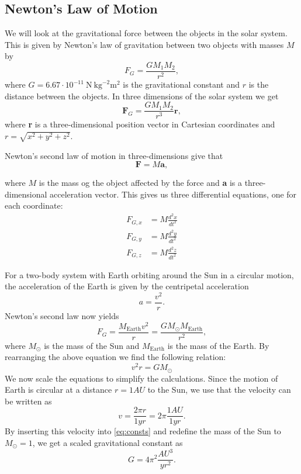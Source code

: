 \documentclass[12pt,a4paper,english]{article}
\begin{document}
\subsection{Newton's Law of Motion}
\label{subsect:Newton}
We will look at the gravitational force between the objects in the solar system. This is given by Newton's law of gravitation between two objects with masses $M$ by
\begin{equation}
\label{eq:2D_FG}
F_G=\frac{GM_1M_2}{r^2},
\end{equation}
where $G=6.67\cdot10^{-11} \ \textrm{N} \ \textrm{kg}^{-2} \textrm{m}^2$ is the gravitational constant and $r$ is the distance between the objects. In three dimensions of the solar system we get
\begin{equation}
\label{eq:3D_FG}
\textbf{F}_G=\frac{GM_1M_2}{r^3}\textbf{r},
\end{equation}
where \textbf{r} is a three-dimensional position vector in Cartesian coordinates and $r=\sqrt{x^2+y^2+z^2}$.

Newton's second law of motion in three-dimensions give that 
\begin{equation}
\label{eq:N2L}
\textbf{F}=M\textbf{a},
\end{equation}

where $M$ is the mass og the object affected by the force and \textbf{a} is a three-dimensional acceleration vector. This gives us three differential equations, one for each coordinate:
\begin{align*}
F_{G,x}&=M\frac{d^2x}{dt^2}\\
F_{G,y}&=M\frac{d^2y}{dt^2}\\
F_{G,z}&=M\frac{d^2z}{dt^2}
\end{align*}

For a two-body system with Earth orbiting around the Sun in a circular motion, the acceleration of the Earth is given by the centripetal acceleration \[a=\frac{v^2}{r}.\]
Newton's second law now yields
\begin{equation}
F_G=\frac{M_{\text{Earth}}v^2}{r}=\frac{GM_{\odot}M_{\text{Earth}}}{r^2},
\end{equation}
where $M_{\odot}$ is the mass of the Sun and $M_{\text{Earth}}$ is the mass of the Earth. By rearranging the above equation we find the following relation:
\begin{equation}
\label{eq:consts}
v^2r=GM_{\odot}
\end{equation}
We now scale the equations to simplify the calculations.
Since the motion of Earth is circular at a distance $r=1AU$ to the Sun, we use that the velocity can be written as
\begin{equation}
\label{eq:circ_vel}
v=\frac{2\pi r}{1yr}=2\pi\frac{1AU}{1yr}.
\end{equation}
By inserting this velocity into \ref{eq:consts} and redefine the mass of the Sun to $M_{\odot}=1$, we get a scaled gravitational constant as
\begin{equation}
\label{eq:scaled_G}
G=4\pi^2\frac{AU^3}{yr^2}.
\end{equation}
\end{document}
